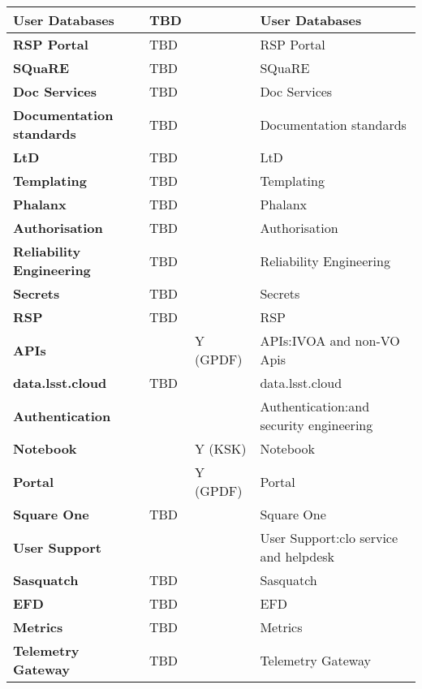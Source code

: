 \begin{longtable}{
p{}   |p{}|p{} |p{}|}
{\textbf{User Databases}} & TBD &  & User Databases \\ \hline
{\textbf{RSP Portal}} & TBD &  & RSP Portal \\ \hline
{\textbf{SQuaRE}} & TBD &  & SQuaRE \\ \hline
{\textbf{Doc Services}} & TBD &  & Doc Services \\ \hline
{\textbf{Documentation standards}} & TBD &  & Documentation standards \\ \hline
{\textbf{LtD}} & TBD &  & LtD \\ \hline
{\textbf{Templating}} & TBD &  & Templating \\ \hline
{\textbf{Phalanx}} & TBD &  & Phalanx \\ \hline
{\textbf{Authorisation}} & TBD &  & Authorisation \\ \hline
{\textbf{Reliability Engineering}} & TBD &  & Reliability Engineering \\ \hline
{\textbf{Secrets}} & TBD &  & Secrets \\ \hline
{\textbf{RSP}} & TBD &  & RSP \\ \hline
{\textbf{APIs}} &  & Y (GPDF) & APIs:IVOA and non-VO Apis \\ \hline
{\textbf{data.lsst.cloud}} & TBD &  & data.lsst.cloud \\ \hline
{\textbf{Authentication}} &  &  & Authentication:and security engineering \\ \hline
{\textbf{Notebook}} &  & Y (KSK) & Notebook \\ \hline
{\textbf{Portal}} &  & Y (GPDF) & Portal \\ \hline
{\textbf{Square One}} & TBD &  & Square One \\ \hline
{\textbf{User Support}} &  &  & User Support:clo service and helpdesk \\ \hline
{\textbf{Sasquatch}} & TBD &  & Sasquatch \\ \hline
{\textbf{EFD}} & TBD &  & EFD \\ \hline
{\textbf{Metrics}} & TBD &  & Metrics \\ \hline
{\textbf{Telemetry Gateway}} & TBD &  & Telemetry Gateway \\ \hline
\end{longtable}
\normalsize
